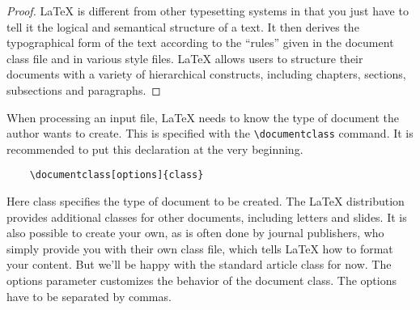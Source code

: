 \documentclass[10pt, unboxed, slabel]{homework}
\begin{document}
\begin{solution}
\begin{proof}
\LaTeX{} is different from other typesetting systems in that you just have to tell it the logical and semantical structure of a text. It then derives the typographical form of the text according to the “rules” given in the document class file and in various style files. \LaTeX{} allows users to structure their documents with a variety of hierarchical constructs, including chapters, sections, subsections and paragraphs.
\end{proof}
\end{solution}

\begin{problem}[Problem 3:]
When processing an input file, LaTeX needs to know the type of document the author wants to create. This is specified with the \verb|\documentclass| command. It is recommended to put this declaration at the very beginning.

\begin{verbatim}
    \documentclass[options]{class}
\end{verbatim}
\end{problem}

\begin{solution}
Here class specifies the type of document to be created. The \LaTeX{} distribution provides additional classes for other documents, including letters and slides. It is also possible to create your own, as is often done by journal publishers, who simply provide you with their own class file, which tells \LaTeX{} how to format your content. But we'll be happy with the standard article class for now. The options parameter customizes the behavior of the document class. The options have to be separated by commas.
\end{solution}
\end{document}
